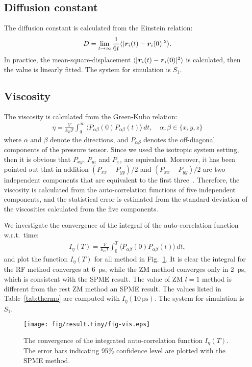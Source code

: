 \documentclass[aip,jcp,a4paper,preprint,unsortedaddress,onecolumn,fleqn]{revtex4-1}
\newcommand{\vect}[1]{\textbf{\textit{#1}}}
\newcommand{\systemsb}{S_1}
\begin{document}
\subsection{Diffusion constant}
The diffusion constant is calculated from the Einstein relation:
\begin{align}
  D = \lim_{t\rightarrow \infty}\frac {1}{6t} \langle \vert \vect r_i(t) - \vect r_i(0)\vert^2\rangle.
\end{align}
In practice, the mean-square-displacement $\langle\vert \vect r_i(t) - \vect
r_i(0)\vert^2\rangle$ is calculated, then the value is linearly fitted. The system for simulation is $\systemsb$.

\subsection{Viscosity}
The viscosity is calculated from the Green-Kubo relation:
\begin{align}
  \eta = \frac{V}{k_BT}\int_0^\infty\langle P_{\alpha\beta}(0) P_{\alpha\beta}(t)\rangle\,dt, \quad \alpha,\beta \in \{x, y, z\}
\end{align}
where $\alpha$ and $\beta$ denote the directions, and
$P_{\alpha\beta}$ denotes the off-diagonal components of the pressure
tensor. Since we used the isotropic system setting, then it is obvious
that $P_{xy}$, $P_{yz}$ and $P_{xz}$ are equivalent. Moreover, it has
been pointed out that in addition $(P_{xx} - P_{yy})/2$ and $(P_{xx} -
P_{yy})/2$ are two independent components that are equivalent to the
first three~\cite{alfe1998first}. Therefore, the viscosity is
calculated from the auto-correlation functions of five independent
components, and the statistical error is estimated from the standard
deviation of the viscosities calculated from the five components.

We investigate the convergence of the integral of the auto-correlation function w.r.t.~time:
\begin{align}
  I_\eta(T) = \frac{V}{k_BT}\int_0^T\langle P_{\alpha\beta}(0) P_{\alpha\beta}(t)\rangle\,dt,
\end{align}
and plot the function $I_\eta(T) $ for all method in
Fig.~\ref{fig:conv-vis}.  It is clear the integral for the RF method
converges at 6~ps, while the ZM method converges only in 2~ps, which
is consistent with the SPME result.  The value of ZM $l=1$ method is
different from the rest ZM method an SPME result.
The values listed  in Table~\ref{tab:thermo} are computed with $I_\eta(10\,\textrm{ps})$.
The
system for simulation is $\systemsb$.

\begin{figure}
  \centering
  \texttt{[image: fig/result.tiny/fig-vis.eps]}
  \caption{The convergence of the integrated auto-correlation function $I_\eta(T) $. The error bars indicating 95\% confidence level are plotted with the SPME method.}
  \label{fig:conv-vis}
\end{figure}


\newpage
{}

\end{document}
